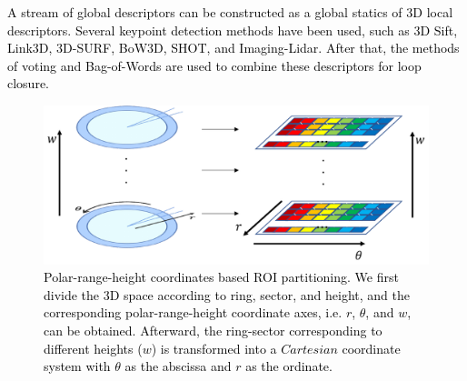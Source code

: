 \documentclass[letterpaper, 10 pt, conference]{ieeeconf}   %
\newcommand\kevin[1]{\textcolor{black}{#1}}
\begin{document}
\kevin{A stream of global descriptors can be constructed as a global statics of 3D local descriptors.
Several keypoint detection methods have been used, such as 3D Sift\cite{3DSIFT}, Link3D\cite{link3d}, 3D-SURF\cite{3dsurf}, BoW3D\cite{bow3d}, SHOT\cite{SHOT}, and Imaging-Lidar\cite{ImagingLidar}. After that, the methods of voting\cite{vote} and Bag-of-Words\cite{bow} are used to combine these descriptors for loop closure.}

\begin{figure}[t]
\centering  %
\includegraphics[width=0.98\linewidth]{TerminologyExplanation.pdf} 
\caption{\kevin{Polar-range-height coordinates based ROI partitioning. We first divide the 3D space according to ring, sector, and height, and the corresponding polar-range-height coordinate axes, i.e. $r$, $\theta$, and $w$, can be obtained. Afterward, the ring-sector corresponding to different heights ($w$) is transformed into a $Cartesian$ coordinate system with $\theta$ as the abscissa and $r$ as the ordinate.}}
\label{TE}
\vspace{-0.2in} 
\end{figure}
\end{document}
